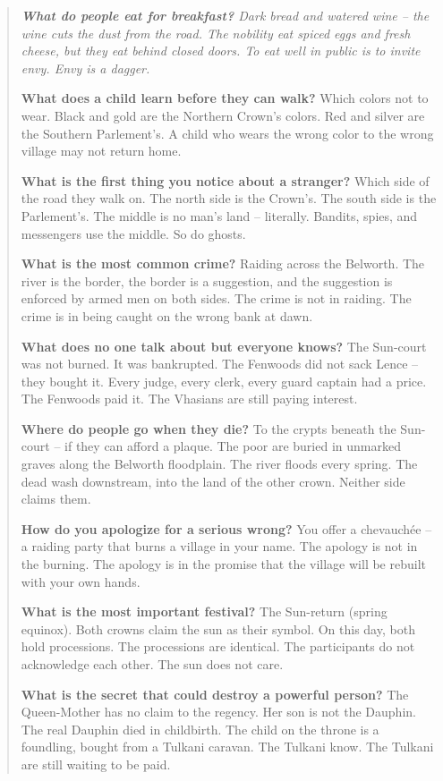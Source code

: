 \documentclass[12pt,oneside]{book}
\newenvironment{almanac}
  {\begin{quote}\small\itshape}
  {\end{quote}}
\begin{document}
\begin{almanac}
\textbf{What do people eat for breakfast?} Dark bread and watered wine -- the wine cuts the dust from the road. The nobility eat spiced eggs and fresh cheese, but they eat behind closed doors. To eat well in public is to invite envy. Envy is a dagger.

\textbf{What does a child learn before they can walk?} Which colors not to wear. Black and gold are the Northern Crown's colors. Red and silver are the Southern Parlement's. A child who wears the wrong color to the wrong village may not return home.

\textbf{What is the first thing you notice about a stranger?} Which side of the road they walk on. The north side is the Crown's. The south side is the Parlement's. The middle is no man's land -- literally. Bandits, spies, and messengers use the middle. So do ghosts.

\textbf{What is the most common crime?} Raiding across the Belworth. The river is the border, the border is a suggestion, and the suggestion is enforced by armed men on both sides. The crime is not in raiding. The crime is in being caught on the wrong bank at dawn.

\textbf{What does no one talk about but everyone knows?} The Sun-court was not burned. It was bankrupted. The Fenwoods did not sack Lence -- they bought it. Every judge, every clerk, every guard captain had a price. The Fenwoods paid it. The Vhasians are still paying interest.

\textbf{Where do people go when they die?} To the crypts beneath the Sun-court -- if they can afford a plaque. The poor are buried in unmarked graves along the Belworth floodplain. The river floods every spring. The dead wash downstream, into the land of the other crown. Neither side claims them.

\textbf{How do you apologize for a serious wrong?} You offer a chevauchée -- a raiding party that burns a village in your name. The apology is not in the burning. The apology is in the promise that the village will be rebuilt with your own hands.

\textbf{What is the most important festival?} The Sun-return (spring equinox). Both crowns claim the sun as their symbol. On this day, both hold processions. The processions are identical. The participants do not acknowledge each other. The sun does not care.

\textbf{What is the secret that could destroy a powerful person?} The Queen-Mother has no claim to the regency. Her son is not the Dauphin. The real Dauphin died in childbirth. The child on the throne is a foundling, bought from a Tulkani caravan. The Tulkani know. The Tulkani are still waiting to be paid.
\end{almanac}
\end{document}
